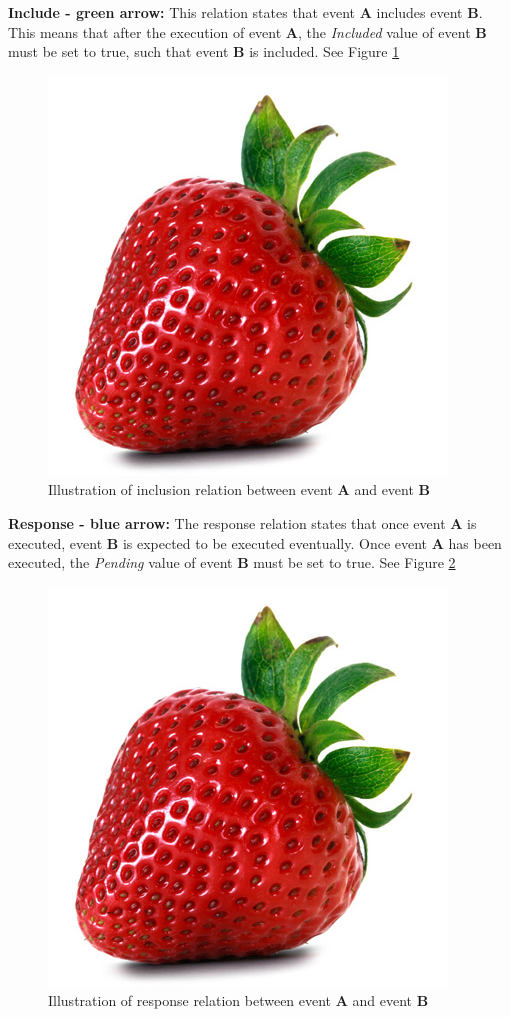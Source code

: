\textbf{Include - green arrow:} This relation states that event \textbf{A} includes event \textbf{B}. This means that  after the execution of event \textbf{A}, the \textit{Included} value of event \textbf{B} must be set to true, such that event \textbf{B} is included. See Figure \ref{fig:InclusionRelation}

\begin{figure}[H!]
\centering
\includegraphics[width=0.5\linewidth]{Figures/strawberry}
\caption{\label{fig:InclusionRelation} Illustration of inclusion relation between event \textbf{A} and event \textbf{B}}
\end{figure} 


\textbf{Response - blue arrow:} The response relation states that once event \textbf{A} is executed, event \textbf{B} is expected to be executed eventually. Once event \textbf{A} has been executed, the \textit{Pending} value of event \textbf{B} must be set to true. See Figure \ref{fig:ResponseRelation}

\begin{figure}[H!]
\centering
\includegraphics[width=0.5\linewidth]{Figures/strawberry}
\caption{\label{fig:ResponseRelation} Illustration of response relation between event \textbf{A} and event \textbf{B}}
\end{figure} 

